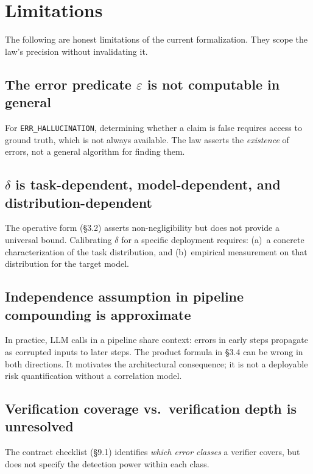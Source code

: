 \documentclass[11pt,a4paper]{article}
\begin{document}
\section{Limitations}

The following are honest limitations of the current formalization. They scope the law's precision without invalidating it.

\subsection{The error predicate $\varepsilon$ is not computable in general}

For \texttt{ERR\_HALLUCINATION}, determining whether a claim is false requires access to ground truth, which is not always available. The law asserts the \emph{existence} of errors, not a general algorithm for finding them.

\subsection{$\delta$ is task-dependent, model-dependent, and distribution-dependent}

The operative form (\S3.2) asserts non-negligibility but does not provide a universal bound. Calibrating $\delta$ for a specific deployment requires: (a)~a concrete characterization of the task distribution, and (b)~empirical measurement on that distribution for the target model.

\subsection{Independence assumption in pipeline compounding is approximate}

In practice, LLM calls in a pipeline share context: errors in early steps propagate as corrupted inputs to later steps. The product formula in \S3.4 can be wrong in both directions. It motivates the architectural consequence; it is not a deployable risk quantification without a correlation model.

\subsection{Verification coverage vs.\ verification depth is unresolved}

The contract checklist (\S9.1) identifies \emph{which error classes} a verifier covers, but does not specify the detection power within each class.
\end{document}
